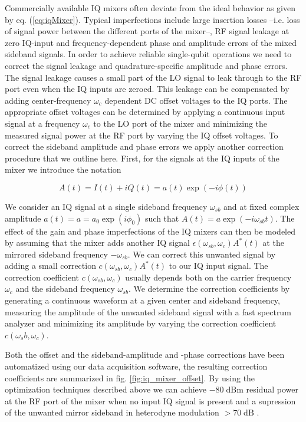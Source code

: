 Commercially available IQ mixers often deviate from the ideal behavior as given by eq. (\ref{eq:iqMixer}). Typical imperfections include large insertion losses --i.e. loss of signal power between the different ports of the mixer--, RF signal leakage at zero IQ-input and frequency-dependent phase and amplitude errors of the mixed sideband signals. In order to achieve reliable single-qubit operations we need to correct the signal leakage and quadrature-specific amplitude and phase errors. The signal leakage causes a small part of the LO signal to leak through to the RF port even when the IQ inputs are zeroed. This leakage can be compensated by adding center-frequency $\omega_c$ dependent DC offset voltages to the IQ ports. The appropriate offset voltages can be determined by applying a continuous input signal at a frequency $\omega_c$ to the LO port of the mixer and minimizing the measured signal power at the RF port by varying the IQ offset voltages. To correct the sideband amplitude and phase errors we apply another correction procedure that we outline here. First, for the signals at the IQ inputs of the mixer we introduce the notation

\begin{equation}
A(t) = I(t)+iQ(t) = a(t)\exp{(-i\phi(t))}
\end{equation}

We consider an IQ signal at a single sideband frequency $\omega_{sb}$ and at fixed complex amplitude $a(t) = a = a_0\exp{(i\phi_0)}$ such that $A(t) = a\exp{(-i \omega_{sb} t)}$. The effect of the gain and phase imperfections of the IQ mixers can then be modeled by assuming that the mixer adds another IQ signal $\epsilon(\omega_{sb},\omega_c)A^*(t)$ at the mirrored sideband frequency $-\omega_{sb}$. We can correct this unwanted signal by adding a small correction $c(\omega_{sb},\omega_c)A^*(t)$ to our IQ input signal. The correction coefficient $c(\omega_{sb},\omega_c)$ usually depends both on the carrier frequency $\omega_c$ and the sideband frequency $\omega_{sb}$. We determine the correction coefficients by generating a continuous waveform at a given center and sideband frequency, measuring the amplitude of the unwanted sideband signal with a fast spectrum analyzer and minimizing its amplitude by varying the correction coefficient $c(\omega_sb,\omega_c)$.

Both the offset and the sideband-amplitude and -phase corrections have been automatized using our data acquisition software, the resulting correction coefficients are summarized in fig. \ref{fig:iq_mixer_offset}. By using the optimization techniques described above we can achieve $-80\;\mathrm{dBm}$ residual power at the RF port of the mixer when no input IQ signal is present and a supression of the unwanted mirror sideband in heterodyne modulation $>70\;\mathrm{dB}$ .

